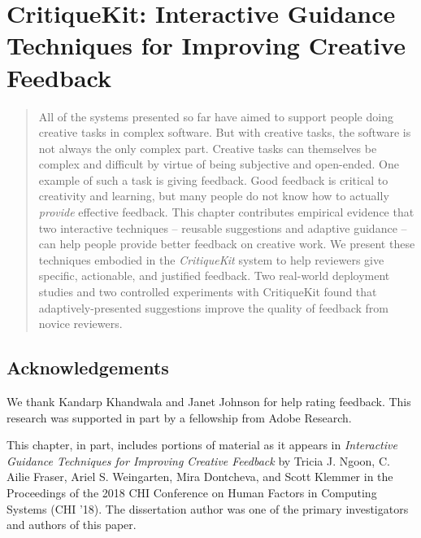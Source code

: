 \chapter{CritiqueKit: Interactive Guidance Techniques for Improving Creative Feedback}
\label{chapter:critiquekit}
\begin{quote}
All of the systems presented so far have aimed to support people doing creative tasks in complex software. But with creative tasks, the software is not always the only complex part. Creative tasks can themselves be complex and difficult by virtue of being subjective and open-ended. One example of such a task is giving feedback. Good feedback is critical to creativity and learning, but many people do not know how to actually \textit{provide} effective feedback. This chapter contributes empirical evidence that two interactive techniques – reusable suggestions and adaptive guidance – can help people provide better feedback on creative work. We present these techniques embodied in the \textit{CritiqueKit} system to help reviewers give specific, actionable, and justified feedback. Two real-world deployment studies and two controlled experiments with CritiqueKit found that adaptively-presented suggestions improve the quality of feedback from novice reviewers.
\end{quote}









\section{Acknowledgements}
We thank Kandarp Khandwala and Janet Johnson for help rating feedback. This research was supported in part by a fellowship from Adobe Research.

This chapter, in part, includes portions of material as it appears in \textit{Interactive Guidance Techniques for Improving Creative Feedback} by Tricia J. Ngoon, C. Ailie Fraser, Ariel S. Weingarten, Mira Dontcheva, and Scott Klemmer in the Proceedings of the 2018 CHI Conference on Human Factors in Computing Systems (CHI '18). The dissertation author was one of the primary investigators and authors of this paper.
